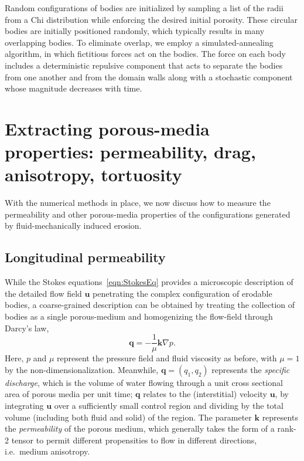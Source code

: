 \documentclass[3p]{elsarticle}
\newcommand{\edit}[1]{{\color{red} #1}}
\newcommand{\grad}{{\nabla}}
\newcommand{\uu}{{\mathbf{u}}}
\newcommand{\bvec}[1]{\mathbf{#1}}
\newcommand {\bq} {\bvec{q}}
\begin{document}
	\edit{Random configurations of bodies are initialized by sampling a list of the radii from a Chi distribution while enforcing the desired initial porosity. These circular bodies are initially positioned randomly, which typically results in many overlapping bodies. To eliminate overlap, we employ a simulated-annealing algorithm, in which fictitious forces act on the bodies. The force on each body includes a deterministic repulsive component that acts to separate the bodies from one another and from the domain walls along with a stochastic component whose magnitude decreases with time.}


\section{Extracting porous-media properties: permeability, drag, anisotropy, tortuosity}
\label{sec:medium}

With the numerical methods in place, we now discuss how to measure the permeability and other porous-media properties of the configurations generated by fluid-mechanically induced erosion.

\subsection{Longitudinal permeability}
\label{LongPerm}

While the Stokes equations~\eqref{eqn:StokesEq} provides a microscopic description of the detailed flow field $\uu$ penetrating the complex configuration of erodable bodies, a coarse-grained description can be obtained by treating the collection of bodies as a single porous-medium and homogenizing the flow-field through Darcy's law,
\begin{equation}
  \label{eqn:Darcy}
  \bq = - \frac{1}{\mu} \bvec{k} \grad p.
\end{equation}
Here, $p$ and $\mu$ represent the pressure field and fluid viscosity as before, with $\mu = 1$ by the non-dimensionalization. Meanwhile, $\bq = (q_1, q_2)$ represents the {\em specific discharge}, which is the volume of water flowing through a unit cross sectional area of porous media per unit time; $\bq$ relates to the (interstitial) velocity $\uu$, by integrating $\uu$ over a sufficiently small control region and dividing by the total volume (including both fluid and solid) of the region. The parameter $\bvec{k}$ represents the {\em permeability} of the porous medium, which generally takes the form of a rank-2 tensor to permit different propensities to flow in different directions, i.e.~medium anisotropy.  
\end{document}
